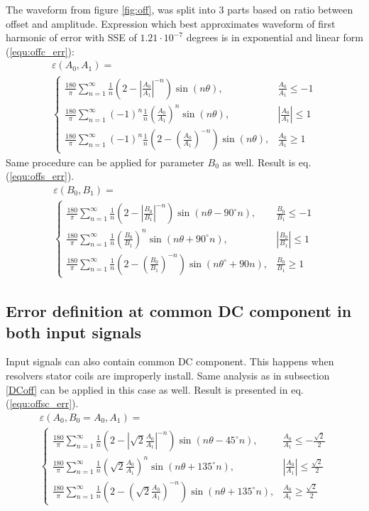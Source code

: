 \documentclass[a4paper]{article}
\begin{document}
The waveform from figure \ref{fig:off}, was split into 3 parts based on ratio between offset and amplitude. Expression which best approximates waveform of first harmonic of error with SSE of $1.21 \cdot 10^{-7}$ degrees is in exponential and linear form (\ref{equ:offc_err}):
\begin{multline}
\label{equ:offc_err}
\varepsilon(A_0, A_1)=\\
\begin{cases}
\frac{180}{\pi}\sum_{n=1}^{\infty} \frac{1}{n}(2-|\frac{A_0}{A_1}|^{-n}) \sin (n \theta ), & \frac{A_0}{A_1}\leq -1 \\
\frac{180}{\pi}\sum_{n=1}^{\infty}(-1)^n\frac{1}{n}(\frac{A_0}{A_1})^n \sin (n \theta ), & |\frac{A_0}{A_1}|\leq 1 \\
\frac{180}{\pi}\sum_{n=1}^{\infty}(-1)^n\frac{1}{n}(2-(\frac{A_0}{A_1})^{-n}) \sin (n \theta ), & \frac{A_0}{A_1}\geq 1
\end{cases}
\end{multline}
Same procedure can be applied for parameter $B_0$ as well. Result is eq. (\ref{equ:offs_err}).
\begin{multline}
\label{equ:offs_err}
\varepsilon(B_0, B_1)=\\
\begin{cases}
\frac{180}{\pi}\sum_{n=1}^{\infty}\frac{1}{n}(2-|\frac{B_0}{B_1}|^{-n}) \sin (n \theta -  90^\circ n), & \frac{B_0}{B_1}\leq -1 \\
\frac{180}{\pi}\sum_{n=1}^{\infty}\frac{1}{n}(\frac{B_0}{B_1})^n \sin (n \theta + 90^\circ n), & |\frac{B_0}{B_1}|\leq 1 \\
\frac{180}{\pi}\sum_{n=1}^{\infty}\frac{1}{n}(2-(\frac{B_0}{B_1})^{-n}) \sin (n \theta^\circ + 90 n), & \frac{B_0}{B_1}\geq 1
\end{cases}
\end{multline}

\subsection{Error definition at common DC component in both input signals}
Input signals can also contain common DC component. 
This happens when resolvers stator coils are improperly install. Same analysis as in subsection \ref{DCoff} can be applied in this case as well. Result is presented in eq. (\ref{equ:offsc_err}).
\begin{multline}
\label{equ:offsc_err}
\varepsilon(A_0,B_0=A_0, A_1)=\\
\begin{cases}
\frac{180}{\pi}\sum_{n=1}^{\infty}\frac{1}{n}(2-|\sqrt{2}\frac{A_0}{A_1}|^{-n}) \sin (n \theta - 45^\circ n), & \frac{A_0}{A_1}\leq -\frac{\sqrt{2}}{2} \\
\frac{180}{\pi}\sum_{n=1}^{\infty}\frac{1}{n}(\sqrt{2}\frac{A_0}{A_1})^n \sin (n \theta + 135^\circ n), & |\frac{A_0}{A_1}|\leq \frac{\sqrt{2}}{2} \\
\frac{180}{\pi}\sum_{n=1}^{\infty}\frac{1}{n}(2-(\sqrt{2}\frac{A_0}{A_1})^{-n}) \sin (n \theta +135^\circ n), & \frac{A_0}{A_1}\geq \frac{\sqrt{2}}{2}
\end{cases}
\end{multline}
\end{document}
